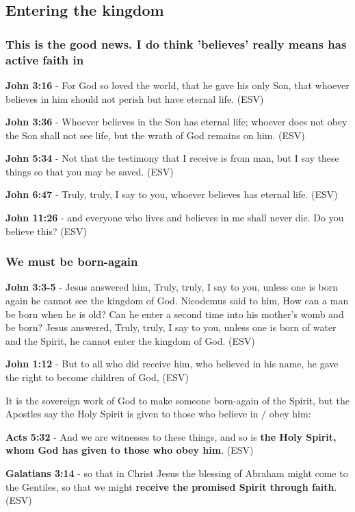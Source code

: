 \documentclass[11pt]{article}
\begin{document}
\subsection{Entering the kingdom}
\label{sec:org2922214}
\subsubsection{This is the good news. I do think 'believes' really means has active faith in}
\label{sec:org75329ef}
\textbf{John 3:16} - For God so loved the world, that he gave his only Son, that whoever believes in him should not perish but have eternal life. (ESV)

\textbf{John 3:36} - Whoever believes in the Son has eternal life; whoever does not obey the Son shall not see life, but the wrath of God remains on him. (ESV)

\textbf{John 5:34} - Not that the testimony that I receive is from man, but I say these things so that you may be saved. (ESV)

\textbf{John 6:47} - Truly, truly, I say to you, whoever believes has eternal life. (ESV)

\textbf{John 11:26} - and everyone who lives and believes in me shall never die. Do you believe this? (ESV)

\subsubsection{We must be born-again}
\label{sec:orgca715a9}
\textbf{John 3:3-5} - Jesus answered him, Truly, truly, I say to you, unless one is born again he cannot see the kingdom of God.  Nicodemus said to him, How can a man be born when he is old?  Can he enter a second time into his mother's womb and be born?  Jesus answered, Truly, truly, I say to you, unless one is born of water and the Spirit, he cannot enter the kingdom of God. (ESV)

\textbf{John 1:12} - But to all who did receive him, who believed in his name, he gave the right to become children of God, (ESV)

It is the sovereign work of God to make someone born-again of the Spirit, but the Apostles say the Holy Spirit is given to those who believe in / obey him:

\textbf{Acts 5:32} - And we are witnesses to these things, and so is \textbf{the Holy Spirit, whom God has given to those who obey him}. (ESV)

\textbf{Galatians 3:14} - so that in Christ Jesus the blessing of Abraham might come to the Gentiles, so that we might \textbf{receive the promised Spirit through faith}. (ESV)
\end{document}
